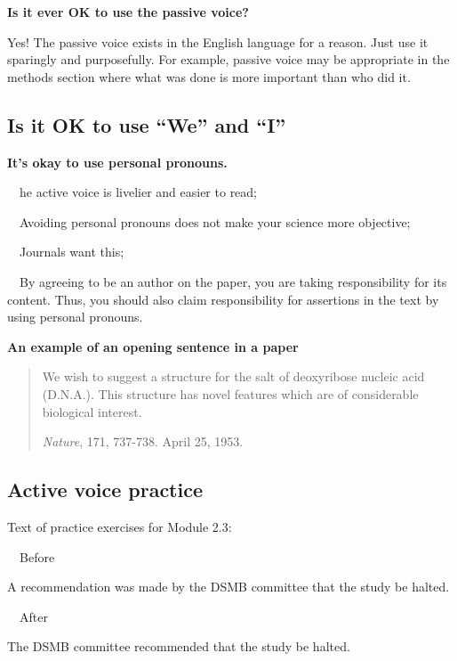 \documentclass[a4paper, 12pt]{article}
\begin{document}
\par\textbf{Is it ever OK to use the passive voice?}
\par Yes! The passive voice exists in the English language for a reason. Just use it sparingly and purposefully. For example, passive voice may be appropriate in the methods section where what was done is more important than who did it.

\newpage\subsection{Is it OK to use ``We'' and ``I''}

\par\textbf{It's okay to use personal pronouns.}
\par\ \textbullet\ he active voice is livelier and easier to read;
\par\ \textbullet\  Avoiding personal pronouns does not make your science more objective;
\par\ \textbullet\ Journals want this;
\par\ \textbullet\ By agreeing to be an author on the paper, you are taking responsibility for its content. Thus, you should also claim responsibility for assertions in the text by using personal pronouns.


\par\textbf{An example of an opening sentence in a paper}

\vspace{4pt}\begin{quote}
We wish to suggest a structure for the salt of deoxyribose nucleic acid (D.N.A.). This structure has novel features which are of considerable biological interest.
\begin{flushright}
\textit{Nature}, 171, 737-738. April 25, 1953.
\end{flushright}
\end{quote}

\subsection{Active voice practice}

Text of practice exercises for Module 2.3:

\par\ \textbullet\ Before
\par A recommendation was made by the DSMB committee that the study be halted.

\par\ \textbullet\ After
\par The DSMB committee recommended that the study be halted.
\end{document}

